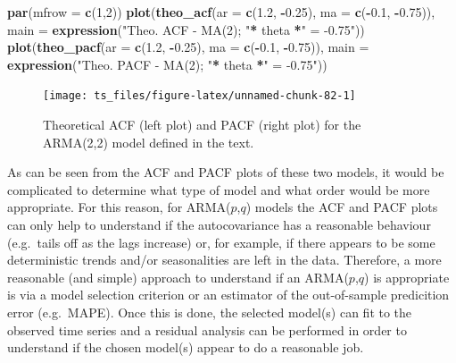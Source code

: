 \documentclass[]{book}
\newenvironment{Shaded}{\begin{snugshade}}{\end{snugshade}}
\newcommand{\KeywordTok}[1]{\textcolor[rgb]{0.13,0.29,0.53}{\textbf{#1}}}
\newcommand{\DataTypeTok}[1]{\textcolor[rgb]{0.13,0.29,0.53}{#1}}
\newcommand{\DecValTok}[1]{\textcolor[rgb]{0.00,0.00,0.81}{#1}}
\newcommand{\FloatTok}[1]{\textcolor[rgb]{0.00,0.00,0.81}{#1}}
\newcommand{\StringTok}[1]{\textcolor[rgb]{0.31,0.60,0.02}{#1}}
\newcommand{\OperatorTok}[1]{\textcolor[rgb]{0.81,0.36,0.00}{\textbf{#1}}}
\newcommand{\NormalTok}[1]{#1}
\theoremstyle{definition}
\theoremstyle{definition}
\theoremstyle{definition}
\theoremstyle{remark}
\begin{document}
\begin{Shaded}
\begin{Highlighting}[]
\KeywordTok{par}\NormalTok{(}\DataTypeTok{mfrow =} \KeywordTok{c}\NormalTok{(}\DecValTok{1}\NormalTok{,}\DecValTok{2}\NormalTok{))}
\KeywordTok{plot}\NormalTok{(}\KeywordTok{theo_acf}\NormalTok{(}\DataTypeTok{ar =} \KeywordTok{c}\NormalTok{(}\FloatTok{1.2}\NormalTok{, }\OperatorTok{-}\FloatTok{0.25}\NormalTok{), }\DataTypeTok{ma =} \KeywordTok{c}\NormalTok{(}\OperatorTok{-}\FloatTok{0.1}\NormalTok{, }\OperatorTok{-}\FloatTok{0.75}\NormalTok{)), }\DataTypeTok{main =} \KeywordTok{expression}\NormalTok{(}\StringTok{"Theo. ACF - MA(2); "}\OperatorTok{*}\StringTok{ }\NormalTok{theta }\OperatorTok{*}\StringTok{" = -0.75"}\NormalTok{))}
\KeywordTok{plot}\NormalTok{(}\KeywordTok{theo_pacf}\NormalTok{(}\DataTypeTok{ar =} \KeywordTok{c}\NormalTok{(}\FloatTok{1.2}\NormalTok{, }\OperatorTok{-}\FloatTok{0.25}\NormalTok{), }\DataTypeTok{ma =} \KeywordTok{c}\NormalTok{(}\OperatorTok{-}\FloatTok{0.1}\NormalTok{, }\OperatorTok{-}\FloatTok{0.75}\NormalTok{)), }\DataTypeTok{main =} \KeywordTok{expression}\NormalTok{(}\StringTok{"Theo. PACF - MA(2); "}\OperatorTok{*}\StringTok{ }\NormalTok{theta }\OperatorTok{*}\StringTok{" = -0.75"}\NormalTok{))}
\end{Highlighting}
\end{Shaded}

\begin{figure}

{\centering \texttt{[image: ts\_files/figure-latex/unnamed-chunk-82-1]} 

}

\caption{Theoretical ACF (left plot) and PACF (right plot) for the ARMA(2,2) model defined in the text.}\label{fig:unnamed-chunk-82}
\end{figure}

As can be seen from the ACF and PACF plots of these two models, it would
be complicated to determine what type of model and what order would be
more appropriate. For this reason, for ARMA(\(p\),\(q\)) models the ACF
and PACF plots can only help to understand if the autocovariance has a
reasonable behaviour (e.g.~tails off as the lags increase) or, for
example, if there appears to be some deterministic trends and/or
seasonalities are left in the data. Therefore, a more reasonable (and
simple) approach to understand if an ARMA(\(p\),\(q\)) is appropriate is
via a model selection criterion or an estimator of the out-of-sample
predicition error (e.g.~MAPE). Once this is done, the selected model(s)
can fit to the observed time series and a residual analysis can be
performed in order to understand if the chosen model(s) appear to do a
reasonable job.
\end{document}
